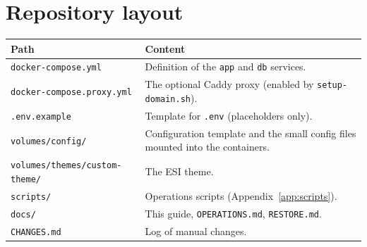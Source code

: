 \documentclass[11pt,a4paper]{report}
\newcommand{\code}[1]{\texttt{\small #1}}
\newcommand{\file}[1]{\texttt{\small #1}}
\begin{document}
\section{Repository layout}
\begin{tabularx}{\linewidth}{@{}P{5.6cm}L@{}}
\toprule
\textbf{Path} & \textbf{Content} \\
\midrule
\file{docker-compose.yml}          & Definition of the \code{app} and \code{db} services. \\
\file{docker-compose.proxy.yml}    & The optional Caddy proxy (enabled by \file{setup-domain.sh}). \\
\file{.env.example}                & Template for \file{.env} (placeholders only). \\
\file{volumes/config/}             & Configuration template and the small config files mounted into the containers. \\
\file{volumes/themes/custom-theme/}& The ESI theme. \\
\file{scripts/}                    & Operations scripts (Appendix~\ref{app:scripts}). \\
\file{docs/}                       & This guide, \file{OPERATIONS.md}, \file{RESTORE.md}. \\
\file{CHANGES.md}                  & Log of manual changes. \\
\bottomrule
\end{tabularx}
\end{document}
